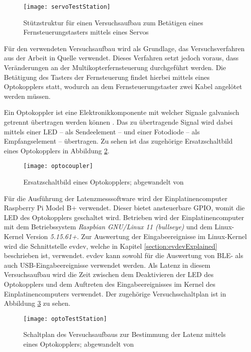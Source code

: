 \begin{figure}[H]
    \centering
    \texttt{[image: servoTestStation]}
    \caption{Stützstruktur für einen Versuchsaufbau zum Betätigen eines Fernsteuerungstasters mittels eines Servos}
    \label{fig:servoTestStation}
\end{figure}

Für den verwendeten Versuchsaufbau wird als Grundlage, das Versuchsverfahren aus der Arbeit in Quelle \cite{wimmerLatenzStation} verwendet. Dieses Verfahren setzt jedoch voraus, dass Veränderungen an der Multikopterfernsteuerung durchgeführt werden. Die Betätigung des Tasters der Fernsteuerung findet hierbei mittels eines Optokopplers statt, wodurch an dem Fernsteuerungstaster zwei Kabel angelötet werden müssen.

Ein Optokoppler ist eine Elektronikkomponente mit welcher Signale galvanisch getrennt übertragen werden können \cite{elektronikKompendiumOptokoppler}. Das zu übertragende Signal wird dabei mittels einer \ac{LED} -- als Sendeelement -- und einer Fotodiode -- als Empfangselement -- übertragen. Zu sehen ist das zugehörige Ersatzschaltbild eines Optokopplers in Abbildung \ref{fig:optocoupler}.

\begin{figure}[H]
    \centering
    \texttt{[image: optocoupler]}
    \caption{Ersatzschaltbild eines Optokopplers; abgewandelt von \cite{altiumOptokoppler}}
    \label{fig:optocoupler}
\end{figure}

Für die Ausführung der Latenzmesssoftware wird der Einplatinencomputer Raspberry Pi Model B+ verwendet. Dieser bietet ansteuerbare \acs{GPIO}, womit die \ac{LED} des Optokopplers geschaltet wird. Betrieben wird der Einplatinencomputer mit dem Betriebssystem \textit{Raspbian GNU/Linux 11 (bullseye)} und dem Linux-Kernel Version \textit{5.15.61+}. Zur Auswertung der Eingabeereignisse im Linux-Kernel wird die Schnittstelle evdev, welche in Kapitel \ref{section:evdevExplained} beschrieben ist, verwendet. evdev kann sowohl für die Auswertung von \ac{BLE}- als auch USB-Eingabeereignisse verwendet werden. Als Latenz in diesem Versuchsaufbau wird die Zeit zwischen dem Deaktivieren der \ac{LED} des Optokopplers und dem Auftreten des Eingabeereignisses im Kernel des Einplatinencomputers verwendet. Der zugehörige Versuchsschaltplan ist in Abbildung \ref{fig:optoTestStation} zu sehen.

\begin{figure}[H]
    \centering
    \texttt{[image: optoTestStation]}
    \caption{Schaltplan des Versuchsaufbaus zur Bestimmung der Latenz mittels eines Optokopplers; abgewandelt von \cites{wimmerLatenzStation}[S.~8; S.~12]{LTV817}}
    \label{fig:optoTestStation}
\end{figure}

